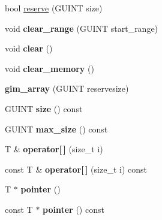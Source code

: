 {\bf }\par
\begin{DoxyCompactItemize}
\item 
bool \hyperlink{classgim__array_a572f94b5b67d505335150a2dea8a7e3d}{reserve} (G\+U\+I\+N\+T size)
\item 
\hypertarget{classgim__array_aaebc1828ad96b461a0351127b1dfb9f3}{void {\bfseries clear\+\_\+range} (G\+U\+I\+N\+T start\+\_\+range)}\label{classgim__array_aaebc1828ad96b461a0351127b1dfb9f3}

\item 
\hypertarget{classgim__array_aae3374d96bac249ba926b6f0825c034e}{void {\bfseries clear} ()}\label{classgim__array_aae3374d96bac249ba926b6f0825c034e}

\item 
\hypertarget{classgim__array_afe6bc1b2062f48a25ff1af7bccf46718}{void {\bfseries clear\+\_\+memory} ()}\label{classgim__array_afe6bc1b2062f48a25ff1af7bccf46718}

\item 
\hypertarget{classgim__array_a42be09e9a8fa1d7e9f3f8385647d69c2}{{\bfseries gim\+\_\+array} (G\+U\+I\+N\+T reservesize)}\label{classgim__array_a42be09e9a8fa1d7e9f3f8385647d69c2}

\item 
\hypertarget{classgim__array_ac43689700269894bb574595c329e919a}{G\+U\+I\+N\+T {\bfseries size} () const }\label{classgim__array_ac43689700269894bb574595c329e919a}

\item 
\hypertarget{classgim__array_af77451250064e94b847bdb6f48d05695}{G\+U\+I\+N\+T {\bfseries max\+\_\+size} () const }\label{classgim__array_af77451250064e94b847bdb6f48d05695}

\item 
\hypertarget{classgim__array_a8c58fd37fa4da11e1dc75a0bb9099363}{T \& {\bfseries operator\mbox{[}$\,$\mbox{]}} (size\+\_\+t i)}\label{classgim__array_a8c58fd37fa4da11e1dc75a0bb9099363}

\item 
\hypertarget{classgim__array_a5c389fa342da9153fff64fd9153dcd2e}{const T \& {\bfseries operator\mbox{[}$\,$\mbox{]}} (size\+\_\+t i) const }\label{classgim__array_a5c389fa342da9153fff64fd9153dcd2e}

\item 
\hypertarget{classgim__array_ad3e924dc4d51d64fd6b4a2ab2ffae793}{T $\ast$ {\bfseries pointer} ()}\label{classgim__array_ad3e924dc4d51d64fd6b4a2ab2ffae793}

\item 
\hypertarget{classgim__array_acda5d0039bccd79197e1a2162d9f98ce}{const T $\ast$ {\bfseries pointer} () const }\label{classgim__array_acda5d0039bccd79197e1a2162d9f98ce}


\end{DoxyCompactItemize}
